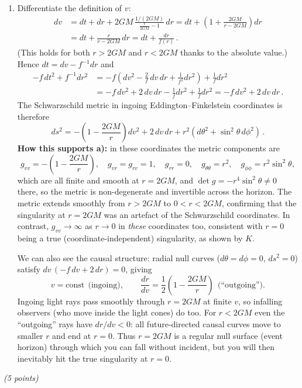 \documentclass[12pt]{article}
\newcommand{\be}{\begin{equation}}
\newcommand{\ee}{\end{equation}}
\newcounter{quesno}
\newcommand{\ques}[1]{\vspace{2em}\stepcounter{quesno}
\noindent{\bf Question \thequesno.} \emph{(#1 points)}\par\medskip}
\begin{document}
\begin{enumerate}[label=\alph*)]
\item Differentiate the definition of $v$:
\be
\begin{split}
dv &= dt + dr + 2GM\,\frac{1/(2GM)}{\frac{r}{2GM}-1}\,dr
= dt + \left(1 + \frac{2GM}{r-2GM}\right)dr \\
&= dt + \frac{r}{r-2GM}\,dr = dt + \frac{dr}{f(r)}\,.
\end{split}
\ee
(This holds for both $r>2GM$ and $r<2GM$ thanks to the absolute value.) Hence $dt = dv - f^{-1}dr$ and
\begin{align}
-f\,dt^2 + f^{-1}dr^2 &= -f\left(dv^2 - \frac{2}{f}\,dv\,dr + \frac{1}{f^2}dr^2\right) + \frac{1}{f}dr^2 \nonumber\\
&= -f\,dv^2 + 2\,dv\,dr - \frac1f dr^2 + \frac1f dr^2 = -f\,dv^2 + 2\,dv\,dr\,.
\end{align}
The Schwarzschild metric in ingoing Eddington--Finkelstein coordinates is therefore
\be
ds^2 = -\left(1-\frac{2GM}{r}\right) dv^2 + 2\, dv\, dr + r^2\left(d\theta^2 + \sin^2\theta\, d\phi^2\right)\,.
\ee
\textbf{How this supports a):} in these coordinates the metric components are
\be
g_{vv} = -\left(1 - \frac{2GM}{r}\right),\quad g_{vr}=g_{rv}=1,\quad g_{rr}=0,\quad g_{\theta\theta}=r^2,\quad g_{\phi\phi}=r^2\sin^2\theta,
\ee
which are all finite and smooth at $r=2GM$, and $\det g = -r^4\sin^2\theta \neq 0$ there, so the metric is
non-degenerate and invertible across the horizon. The metric extends smoothly from $r>2GM$ to $0<r<2GM$, confirming that
the singularity at $r=2GM$ was an artefact of the Schwarzschild coordinates. In contrast, $g_{vv}\to\infty$ as $r\to0$ in
\emph{these} coordinates too, consistent with $r=0$ being a true (coordinate-independent) singularity, as shown by $K$.

We can also see the causal structure: radial null curves ($d\theta=d\phi=0$, $ds^2=0$) satisfy
$dv\,\left(-f\,dv + 2\,dr\right)=0$, giving
\be
v = \text{const}\ \ \text{(ingoing)},\qquad \frac{dr}{dv} = \frac{1}{2}\left(1-\frac{2GM}{r}\right)\ \ \text{(``outgoing'')}.
\ee
Ingoing light rays pass smoothly through $r=2GM$ at finite $v$, so infalling observers (who move inside the light cones)
do too. For $r<2GM$ even the ``outgoing'' rays have $dr/dv<0$: all future-directed causal curves move to smaller $r$
and end at $r=0$. Thus $r=2GM$ is a regular null surface (event horizon) through which you can fall without incident, but
you will then inevitably hit the true singularity at $r=0$.
\end{enumerate}

\ques{5}
\end{document}

